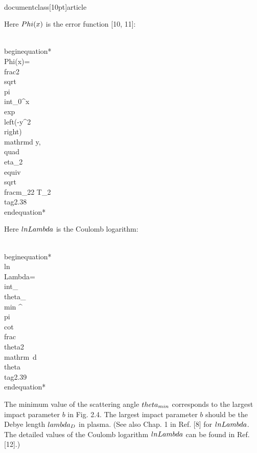 \\documentclass[10pt]{article}
\begin{document}
Here $\\Phi(x)$ is the error function [10, 11]:


\\begin{equation*}
\\Phi(x)=\\frac{2}{\\sqrt{\\pi}} \\int_{0}^{x} \\exp \\left(-y^{2}\\right) \\mathrm{d} y, \\quad \\eta_{2} \\equiv \\sqrt{\\frac{m_{2}}{2 T_{2}}} \\tag{2.38}
\\end{equation*}


Here $\\ln \\Lambda$ is the Coulomb logarithm:


\\begin{equation*}
\\ln \\Lambda=\\int_{\\theta_{\\min }}^{\\pi} \\cot \\frac{\\theta}{2} \\mathrm{~d} \\theta \\tag{2.39}
\\end{equation*}


The minimum value of the scattering angle $\\theta_{\\min }$ corresponds to the largest impact parameter $b$ in Fig. 2.4. The largest impact parameter $b$ should be the Debye length $\\lambda_{D}$ in plasma. (See also Chap. 1 in Ref. [8] for $\\ln \\Lambda$. The detailed values of the Coulomb logarithm $\\ln \\Lambda$ can be found in Ref. [12].)
\end{document}
